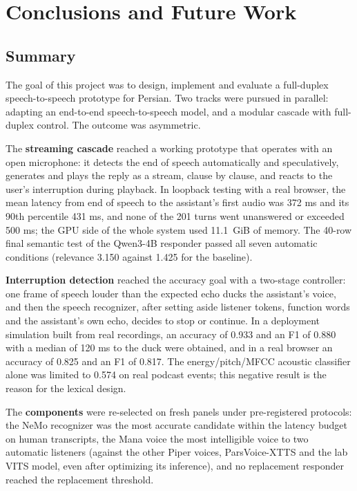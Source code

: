 \chapter{Conclusions and Future Work}
\label{ch:conclusions}

\section{Summary}
\label{sec:summary}

The goal of this project was to design, implement and evaluate a full-duplex
speech-to-speech prototype for Persian. Two tracks were pursued in parallel: adapting an
end-to-end speech-to-speech model, and a modular cascade with full-duplex control. The
outcome was asymmetric.

The \textbf{streaming cascade} reached a working prototype that operates with an open
microphone: it detects the end of speech automatically and speculatively, generates and
plays the reply as a stream, clause by clause, and reacts to the user's interruption during
playback. In loopback testing with a real browser, the mean latency from end of speech to
the assistant's first audio was 372 ms and its 90th percentile 431 ms, and none of the 201
turns went unanswered or exceeded 500 ms; the GPU side of the whole system used 11.1~GiB of
memory. The 40-row final semantic test of the Qwen3-4B responder passed all seven automatic
conditions (relevance 3.150 against 1.425 for the baseline).

\textbf{Interruption detection} reached the accuracy goal with a two-stage controller: one frame of
speech louder than the expected echo ducks the assistant's voice, and then the speech recognizer,
after setting aside listener tokens, function words and the assistant's own echo, decides to stop
or continue. In a deployment simulation built from real recordings, an accuracy of 0.933 and an F1
of 0.880 with a median of 120 ms to the duck were obtained, and in a real browser an accuracy of
0.825 and an F1 of 0.817. The energy/pitch/MFCC acoustic classifier alone was limited to 0.574 on
real podcast events; this negative result is the reason for the lexical design.

The \textbf{components} were re-selected on fresh panels under pre-registered protocols: the NeMo
recognizer was the most accurate candidate within the latency budget on human transcripts, the
Mana voice the most intelligible voice to two automatic listeners (against the other Piper voices,
ParsVoice-XTTS and the lab VITS model, even after optimizing its inference), and no replacement
responder reached the replacement threshold.

